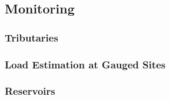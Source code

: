 \subsection{Monitoring}
	\subsubsection{Tributaries}
	\subsubsection{Load Estimation at Gauged Sites}
	\subsubsection{Reservoirs}
\pagebreak